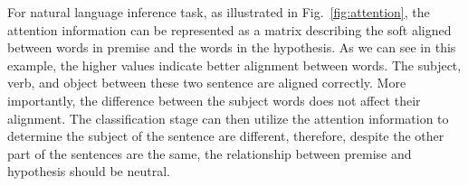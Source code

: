 For natural language inference task, as illustrated in Fig.~\ref{fig:attention}, the attention information can be represented as a matrix describing the soft aligned between words in premise and the words in the hypothesis. As we can see in this example, the higher values indicate better alignment between words. The subject, verb, and object between these two sentence are aligned correctly. More importantly, the difference between the subject words does not affect their alignment. The classification stage can then utilize the attention information to determine the subject of the sentence are different, therefore, despite the other part of the sentences are the same, the relationship between premise and hypothesis should be neutral.

